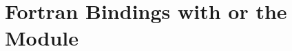 \section{Fortran Bindings with \texorpdfstring{}{mpif.h} or
the \texorpdfstring{}{mpi} Module}
\label{sec:lang:fortran-mpifh-and-mpi-module}


